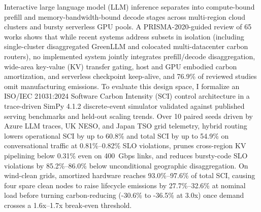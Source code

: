 Interactive large language model (LLM) inference separates into compute-bound prefill and memory-bandwidth-bound decode stages across multi-region cloud clusters and bursty serverless GPU pools. A PRISMA-2020-guided review of 65 works shows that while recent systems address subsets in isolation (including single-cluster disaggregated GreenLLM and colocated multi-datacenter carbon routers), no implemented system jointly integrates prefill/decode disaggregation, wide-area key-value (KV) transfer gating, host and GPU embodied carbon amortization, and serverless checkpoint keep-alive, and 76.9\% of reviewed studies omit manufacturing emissions. To evaluate this design space, I formalize an ISO/IEC 21031:2024 Software Carbon Intensity (SCI) control architecture in a trace-driven SimPy 4.1.2 discrete-event simulator validated against published serving benchmarks and held-out scaling trends. Over 10 paired seeds driven by Azure LLM traces, UK NESO, and Japan TSO grid telemetry, hybrid routing lowers operational SCI by up to 60.8\% and total SCI by up to 54.9\% on conversational traffic at 0.81\%--0.82\% SLO violations, prunes cross-region KV pipelining below 0.31\% even on 400~Gbps links, and reduces bursty-code SLO violations by 85.2\%--86.0\% below unconditional geographic disaggregation. On wind-clean grids, amortized hardware reaches 93.0\%--97.6\% of total SCI, causing four spare clean nodes to raise lifecycle emissions by 27.7\%--32.6\% at nominal load before turning carbon-reducing (-30.6\% to -36.5\% at 3.0x) once demand crosses a 1.6x--1.7x break-even threshold.
